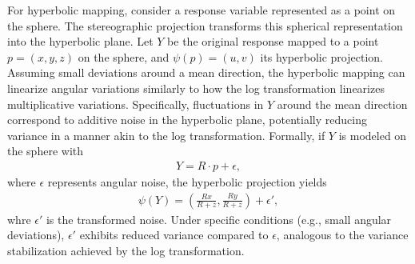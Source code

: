 For hyperbolic mapping, consider a response variable represented as a point on the sphere.
The stereographic projection transforms this spherical representation into the hyperbolic plane.
Let $Y$ be the original response mapped to a point $p = (x, y, z)$ on the sphere, and $\psi(p) = (u, v)$ its hyperbolic projection.
Assuming small deviations around a mean direction, the hyperbolic mapping can linearize angular variations similarly to how the log transformation linearizes multiplicative variations.
Specifically, fluctuations in $Y$ around the mean direction correspond to additive noise in the hyperbolic plane, potentially reducing variance in a manner akin to the log transformation.
Formally, if $Y$ is modeled on the sphere with
\begin{align*}
    Y = R \cdot p + \epsilon,
\end{align*}
where $\epsilon$ represents angular noise, the hyperbolic projection yields
\begin{align*}
    \psi(Y) = \left(\frac{Rx}{R + z}, \frac{Ry}{R + z}\right) + \epsilon',
\end{align*}
whre $\epsilon'$ is the transformed noise.
Under specific conditions (e.g., small angular deviations), $\epsilon'$ exhibits reduced variance compared to $\epsilon$, analogous to the variance stabilization achieved by the log transformation.


